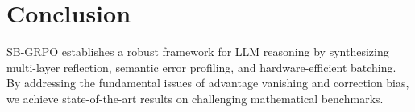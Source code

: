 \section{Conclusion}
SB-GRPO establishes a robust framework for LLM reasoning by synthesizing multi-layer reflection, semantic error profiling, and hardware-efficient batching. By addressing the fundamental issues of advantage vanishing and correction bias, we achieve state-of-the-art results on challenging mathematical benchmarks.
